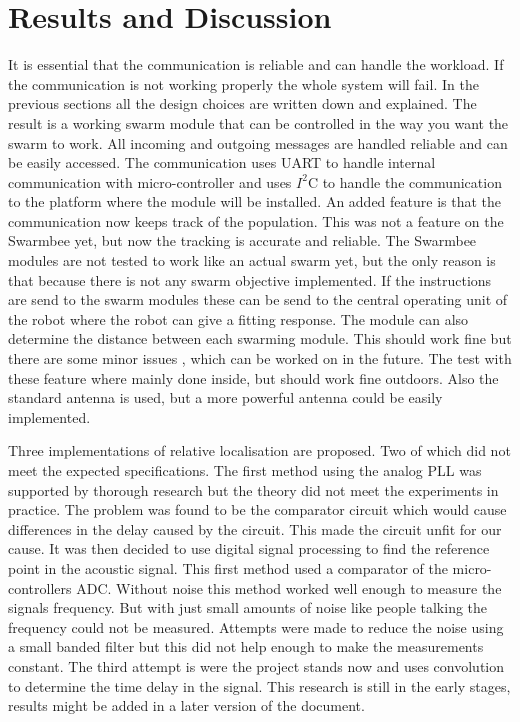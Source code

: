 \documentclass[10pt,a4paper]{article}
\begin{document}
\section{Results and Discussion}
It is essential that the communication is reliable and can handle the workload. If the communication is not working properly the whole system will fail. In the previous sections all the design choices are written down and explained. The result is a working swarm module that can be controlled in the way you want the swarm to work. All incoming and outgoing messages are handled reliable and can be easily accessed. The communication uses UART to handle internal communication with micro-controller and uses $I^2$C to handle the communication to the platform where the module will be installed. An added feature is that the communication now keeps track of the population. This was not a feature on the Swarmbee yet, but now the tracking is accurate and reliable. The Swarmbee modules are not tested to work like an actual swarm yet, but the only reason is that because there is not any swarm objective implemented. If the instructions are send to the swarm modules these can be send to the central operating unit of the robot where the robot can give a fitting response. The module can also determine the distance between each swarming module. This should work fine but there are some minor issues , which can be worked on in the future. The test with these feature where mainly done inside, but should work fine outdoors. Also the standard antenna is used, but a more powerful antenna could be easily implemented.

Three implementations of relative localisation are proposed. Two of which did not meet the expected specifications. The first method using the analog PLL was supported by thorough research but the theory did not meet the experiments in practice. The problem was found to be the comparator circuit which would cause differences in the delay caused by the circuit. This made the circuit unfit for our cause. It was then decided to use digital signal processing to find the reference point in the acoustic signal. This first method used a comparator of the micro-controllers ADC. Without noise this method worked well enough to measure the signals frequency. But with just small amounts of noise like people talking the frequency could not be measured. Attempts were made to reduce the noise using a small banded filter but this did not help enough to make the measurements constant. The third attempt is were the project stands now and uses convolution to determine the time delay in the signal. This research is still in the early stages, results might be added in a later version of the document.
\end{document}

